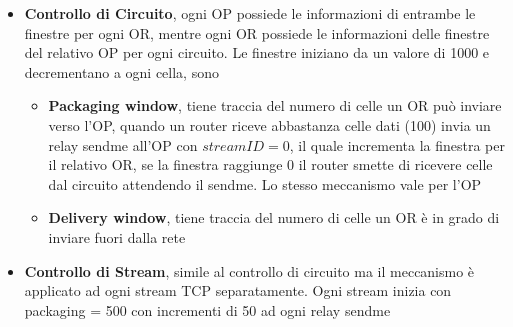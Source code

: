 \begin{itemize}
    \item \textbf{Controllo di Circuito}, ogni OP possiede le informazioni di entrambe le finestre per ogni OR, mentre ogni OR possiede le informazioni delle finestre del relativo OP per ogni circuito. Le finestre iniziano da un valore di 1000 e decrementano a ogni cella, sono
    \begin{itemize}
        \item \textbf{Packaging window}, tiene traccia del numero di celle un OR può inviare verso l'OP, quando un router riceve abbastanza celle dati (100) invia un relay sendme all'OP con $streamID = 0$, il quale incrementa la finestra per il relativo OR, se la finestra raggiunge 0 il router smette di ricevere celle dal circuito attendendo il sendme. Lo stesso meccanismo vale per l'OP
        \item \textbf{Delivery window}, tiene traccia del numero di celle un OR è in grado di inviare fuori dalla rete
    \end{itemize}
    \item \textbf{Controllo di Stream}, simile al controllo di circuito ma il meccanismo è applicato ad ogni stream TCP separatamente. Ogni stream inizia con packaging = 500 con incrementi di 50 ad ogni relay sendme
\end{itemize}

\newpage
